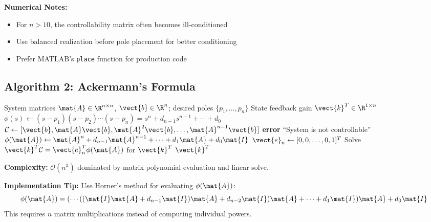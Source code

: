 \textbf{Numerical Notes:}
\begin{itemize}
    \item For $n > 10$, the controllability matrix often becomes ill-conditioned
    \item Use balanced realization before pole placement for better conditioning
    \item Prefer MATLAB's \texttt{place} function for production code
\end{itemize}

\subsection{Algorithm 2: Ackermann's Formula}

\begin{algorithm}[H]
\caption{Ackermann's Formula for Single-Input Pole Placement}
\label{alg:ackermann}
\begin{algorithmic}[1]
\REQUIRE System matrices $\mat{A} \in \R^{n \times n}$, $\vect{b} \in \R^{n}$; desired poles $\{p_1, \ldots, p_n\}$
\ENSURE State feedback gain $\vect{k}^T \in \R^{1 \times n}$
\STATE
{}
\STATE $\phi(s) \gets (s - p_1)(s - p_2)\cdots(s - p_n) = s^n + d_{n-1}s^{n-1} + \cdots + d_0$
\STATE
{}
\STATE $\mathcal{C} \gets [\vect{b}, \mat{A}\vect{b}, \mat{A}^2\vect{b}, \ldots, \mat{A}^{n-1}\vect{b}]$
    \STATE \textbf{error} ``System is not controllable''
\ENDIF
\STATE
{}
\STATE $\phi(\mat{A}) \gets \mat{A}^n + d_{n-1}\mat{A}^{n-1} + \cdots + d_1\mat{A} + d_0\mat{I}$
\STATE {}
\STATE
{}
\STATE $\vect{e}_n \gets [0, 0, \ldots, 0, 1]^T$
\STATE Solve $\vect{k}^T \mathcal{C} = \vect{e}_n^T \phi(\mat{A})$ for $\vect{k}^T$
\STATE
\RETURN $\vect{k}^T$
\end{algorithmic}
\end{algorithm}

\textbf{Complexity:} $\mathcal{O}(n^3)$ dominated by matrix polynomial evaluation and linear solve.

\textbf{Implementation Tip:} Use Horner's method for evaluating $\phi(\mat{A})$:
\begin{equation}
\phi(\mat{A}) = (\cdots((\mat{I}\mat{A} + d_{n-1}\mat{I})\mat{A} + d_{n-2}\mat{I})\mat{A} + \cdots + d_1\mat{I})\mat{A} + d_0\mat{I}
\end{equation}
This requires $n$ matrix multiplications instead of computing individual powers.

